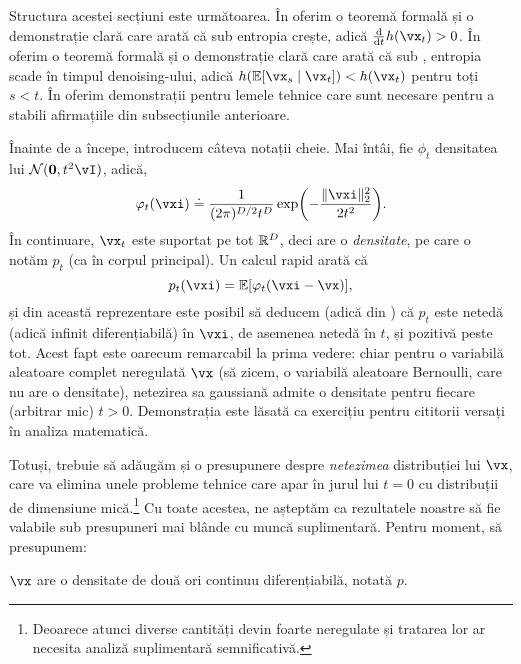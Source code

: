 \documentclass[../../book-main_ro.tex]{subfiles}
\begin{document}
Structura acestei secțiuni este următoarea. În  oferim o teoremă formală și o demonstrație clară care arată că sub  entropia crește, adică \(\odv*{h(\vx_{t})}{t} > 0\). În  oferim o teoremă formală și o demonstrație clară care arată că sub , entropia scade în timpul denoising-ului, adică \(h(\Ex[\vx_{s} \given \vx_{t}]) < h(\vx_{t})\) pentru toți \(s < t\). În  oferim demonstrații pentru lemele tehnice care sunt necesare pentru a stabili afirmațiile din subsecțiunile anterioare.

Înainte de a începe, introducem câteva notații cheie. Mai întâi, fie \(\phi_{t}\) densitatea lui \(\dNorm(\vzero, t^{2}\vI)\), adică,
\begin{equation}\label{eq:gaussian_noise_time_t}
    \phi_{t}(\vxi) \doteq \frac{1}{(2\pi)^{D/2}t^{D}}\exp\rp{-\frac{\norm{\vxi}_{2}^{2}}{2t^{2}}}.
\end{equation}
În continuare, \(\vx_{t}\) este suportat pe tot \(\mathbb{R}^{D}\), deci are o \textit{densitate}, pe care o notăm \(p_{t}\) (ca în corpul principal). Un calcul rapid arată că
\begin{equation}\label{eq:p_t_representation}
    p_{t}(\vxi) = \Ex[\phi_{t}(\vxi - \vx)],
\end{equation}
și din această reprezentare este posibil să deducem (adică din ) că \(p_{t}\) este netedă (adică infinit diferențiabilă) în \(\vxi\), de asemenea netedă în \(t\), și pozitivă peste tot. Acest fapt este oarecum remarcabil la prima vedere: chiar pentru o variabilă aleatoare complet neregulată \(\vx\) (să zicem, o variabilă aleatoare Bernoulli, care nu are o densitate), netezirea sa gaussiană admite o densitate pentru fiecare (arbitrar mic) \(t > 0\). Demonstrația este lăsată ca exercițiu pentru cititorii versați în analiza matematică.

Totuși, trebuie să adăugăm și o presupunere despre \textit{netezimea} distribuției lui \(\vx\), care va elimina unele probleme tehnice care apar în jurul lui \(t = 0\) cu distribuții de dimensiune mică.\footnote{Deoarece atunci diverse cantități devin foarte neregulate și tratarea lor ar necesita analiză suplimentară semnificativă.} Cu toate acestea, ne așteptăm ca rezultatele noastre să fie valabile sub presupuneri mai blânde cu muncă suplimentară. Pentru moment, să presupunem:
\begin{assumption}\label{assumption:entropy_x_density}
    \(\vx\) are o densitate de două ori continuu diferențiabilă, notată \(p\).
\end{assumption}
\end{document}
